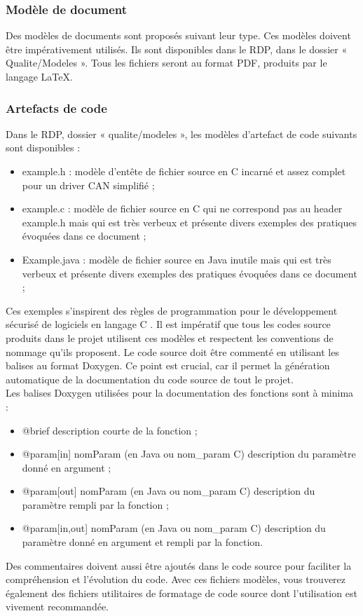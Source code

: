 \documentclass[a4paper,11pt,titlepage]{article}
\begin{document}
\subsubsection{Modèle de document}
Des modèles de documents sont proposés suivant leur type.
Ces modèles doivent être impérativement utilisés.
Ils sont disponibles dans le RDP, dans le dossier « Qualite/Modeles ».
Tous les fichiers seront au format PDF, produits par le langage LaTeX.

\subsubsection{Artefacts de code} \label{sec:ArtefCode}
Dans le RDP, dossier « qualite/modeles »,
les modèles d'artefact de code suivants sont disponibles :
\begin{itemize}
    \item example.h : modèle d'entête de fichier source en C incarné et assez complet pour un driver CAN simplifié ;
    \item example.c : modèle de fichier source en C qui ne correspond pas au header example.h mais qui est très verbeux et
    présente divers exemples des pratiques évoquées dans ce document ;
    \item Example.java : modèle de fichier source en Java inutile mais qui est très verbeux et présente divers exemples des pratiques évoquées dans ce document ;
\end{itemize}

Ces exemples s'inspirent des règles de programmation pour le développement sécurisé de logiciels en langage C
\cite[ANSSI-PA-073]{guideANSSI}.
Il est impératif que tous les codes source produits dans le projet
utilisent ces modèles et respectent les conventions de nommage qu'ils
proposent. Le code source doit être commenté en utilisant les balises au format
Doxygen. Ce point est crucial, car il permet la génération automatique
de la documentation du code source de tout le projet.\\

Les balises Doxygen utilisées pour la documentation des fonctions sont à minima :
\begin{itemize}
    \item @brief description courte de la fonction ;
    \item @param[in] nomParam (en Java ou nom\_param C) description du paramètre donné en argument ;
    \item @param[out] nomParam (en Java ou nom\_param C) description du paramètre rempli par la fonction ;
    \item @param[in,out] nomParam (en Java ou nom\_param C) description du paramètre donné en argument et rempli par la fonction.
\end{itemize}
Des commentaires doivent aussi être ajoutés dans le code source pour faciliter
la compréhension et l'évolution du code. Avec ces fichiers modèles, vous trouverez également des
fichiers utilitaires de formatage de code source dont l'utilisation est vivement recommandée.\\
\end{document}
